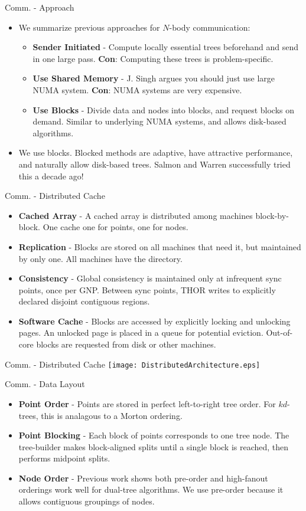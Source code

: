 \documentclass[pdf,colorBG,slideColor]{prosper}
\newcommand{\itemt}[1]{\item {\bf #1} -}
\begin{document}
\begin{slide}{Comm. - Approach}
  \begin{itemize}
    \item We summarize previous approaches for $N$-body communication:
    \begin{itemize}
      \itemt{Sender Initiated}
      Compute locally essential trees beforehand and send in one large pass.
      {\bf Con}: Computing these trees is problem-specific.
      \itemt{Use Shared Memory}
      J. Singh argues you should just use large NUMA system.
      {\bf Con}: NUMA systems are very expensive.
      \itemt{Use Blocks}
      Divide data and nodes into blocks, and request blocks on demand.
      Similar to underlying NUMA systems, and allows disk-based algorithms.
    \end{itemize}
    \item We use blocks.  Blocked methods are adaptive, have attractive
    performance, and naturally allow disk-based trees.
    Salmon and Warren successfully tried this a decade ago!
  \end{itemize}
\end{slide}

\begin{slide}{Comm. - Distributed Cache}
  \begin{itemize}
    \itemt{Cached Array}
    A cached array is distributed among machines block-by-block.
    One cache one for points, one for nodes.
    \itemt{Replication}
    Blocks are stored on all machines that need it, but maintained by only one.
    All machines have the directory.
    \itemt{Consistency}
    Global consistency is maintained only at infrequent sync points, once per GNP.
    Between sync points, THOR writes to explicitly declared disjoint contiguous regions.
    \itemt{Software Cache}
    Blocks are accessed by explicitly locking and unlocking pages.
    An unlocked page is placed in a queue for potential eviction.
    Out-of-core blocks are requested from disk or other machines.
  \end{itemize}
\end{slide}
  
\begin{slide}{Comm. - Distributed Cache}
  \texttt{[image: DistributedArchitecture.eps]}
\end{slide}

\begin{slide}{Comm. - Data Layout}
  \begin{itemize}
    \itemt{Point Order}
    Points are stored in perfect left-to-right tree order.
    For $kd$-trees, this is analagous to a Morton ordering.
    \itemt{Point Blocking}
    Each block of points corresponds to one tree node.
    The tree-builder makes block-aligned splits until a single block
    is reached, then performs midpoint splits.
    \itemt{Node Order}
    Previous work shows both pre-order and high-fanout orderings work well
    for dual-tree algorithms. We use pre-order because it allows contiguous
    groupings of nodes.
  \end{itemize}
\end{slide}
\end{document}
